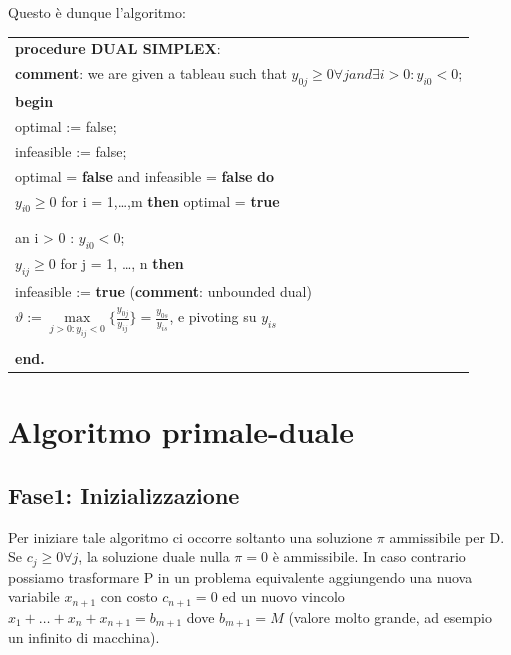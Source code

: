 \documentclass[11pt]{book}
\begin{document}
Questo \`e dunque l'algoritmo:

\small
\vspace{11pt}
\begin{center}
\begin{tabular}{||l||}
\hline\hline
{\bf procedure DUAL SIMPLEX}:\\
{\bf comment}: we are given a tableau such that $y_{0j} \geq 0 \forall j and \exists i > 0 : y_{i0} < 0$;\\
{\bf begin}\\
\phantom{aa}optimal := false;\\
\phantom{aa}infeasible := false;\\
\phantom{aa}{\bf while} optimal = {\bf false} and infeasible = {\bf false} {\bf do}\\
\phantom{aaaa}{\bf if} $y_{i0} \geq 0$ for i = 1,\dots,m {\bf then} optimal = {\bf true}\\
\phantom{aaaa}{\bf else}\\
\phantom{aaaaaa}{\bf begin}\\
\phantom{aaaaaaaa}{\bf select} an i > 0 : $y_{i0} < 0$;\\
\phantom{aaaaaaaa}{\bf if} $y_{ij} \geq 0$ for j = 1, \dots, n {\bf
  then}\\
\phantom{aaaaaaaaaa} infeasible := {\bf true} ({\bf comment}: unbounded dual)\\
\phantom{aaaaaaaa}{\bf else} $\vartheta := \max\limits_{j>0:y_{ij}<0} \bigr \{
\frac{y_{0j}}{y_{ij}} \} = \frac{y_{0s}}{y_{is}}$, e pivoting su $y_{is}$\\
\phantom{aaaaaa}{\bf end}\\
{\bf end.}\\
\hline\hline
\end{tabular}
\end{center}
\vspace{11pt}
\normalsize

\section{Algoritmo primale-duale}


\subsection{Fase1: Inizializzazione}

Per iniziare tale algoritmo ci occorre soltanto una soluzione $\pi$
ammissibile per D. Se $c_j \geq 0 \forall j$, la soluzione duale nulla
$\pi = 0$ \`e ammissibile. In caso contrario possiamo trasformare P in
un problema equivalente aggiungendo una nuova variabile $x_{n+1}$ con
costo $c_{n+1} = 0$ ed un nuovo vincolo $x_1 + \dots + x_n + x_{n+1} =
b_{m+1}$ dove $b_{m+1} = M$ (valore molto grande, ad esempio un
infinito di macchina).
\end{document}
